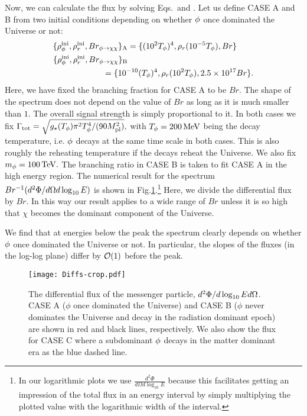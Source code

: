 \documentclass[superscriptaddress,aps,preprintnumbers,amsmath,showpacs,amssymb,prd,nofootinbib,reprint]{revtex4-1}
\begin{document}
Now, we can calculate the flux by solving Eqs.\, and . Let us define CASE A and B from two initial conditions depending on whether $\phi$ once dominated the Universe or not: 
\begin{align}
\nonumber
\{\rho_{\f}^{\rm ini}, \rho_r^{\rm ini}, Br_{\f\to \chi\chi}\}_{\text{A}}&=\{(10^{2}T_\f)^4, \rho_r(10^{-5}T_\f), Br\}\\
\{\rho_{\f}^{\rm ini}, \rho_r^{\rm ini}, Br_{\f\to \chi\chi}\}_{\text{B}}&
\\\nonumber&\!\!\!\!\!\!\!\!\!\!\!\!\!\!\!\!\!\!=\{10^{-10}(T_\f)^4, \rho_r(10^{2}T_\f), 2.5\times 10^{17}Br \}.
\end{align}
Here, we have fixed the branching fraction for CASE A to be $Br$. 
The shape of the spectrum does not depend on the value of $Br$ as long as it is much smaller than $1$. The overall signal strength is simply proportional to it.
In both cases we fix 
$
\Gamma_{\rm tot}= \sqrt{g_{\star}(T_\phi)\pi^2T_\phi^4/(90M_{\rm pl}^2)},
$
with $T_\phi=200{\rm \, MeV}$ being the decay temperature, i.e. $\phi$ decays at the same time scale in both cases. This is also roughly the reheating temperature if the decays reheat the Universe. 
We also fix $m_\phi =100{\rm \, TeV}.$ The branching ratio in CASE B is taken to fit CASE A in the high energy region. 
The numerical result for the spectrum $Br^{-1}(d^2 \Phi/ d\Omega d\log_{10}E )$ is shown in Fig.\ref{fig:1}.\footnote{In our logarithmic plots we use $\frac{d^2\Phi}{ d\Omega d\log_{10}{E}}$ because this facilitates getting an impression of the total flux in an energy interval by simply multiplying the plotted value with the logarithmic width of the interval.}
Here, we divide the differential flux by $Br$. In this way our result applies to a wide range of $Br$ unless it is so high that $\chi$ becomes the dominant component of the Universe.

We find that at energies below the peak the spectrum clearly depends on whether $\phi$ once dominated the Universe or not. 
In particular, the slopes of the fluxes (in {the} log-log plane) differ by $\mathcal{O}(1)$ before the peak. 
\begin{figure}[t!]
\begin{center}  
\texttt{[image: Diffs-crop.pdf]}
\end{center}
\caption{The differential flux of the messenger particle, $d^2 \Phi/d\log_{10}{E} d\Omega$. CASE A ($\phi$ once dominated the Universe)  and CASE B ($\phi$ never dominates the Universe and decay in the radiation dominant epoch) are shown in red and black lines, respectively.
We also show the flux for CASE C where a subdominant $\phi$ decays in the matter dominant era as the blue dashed line. }
\label{fig:1}
\end{figure}
\end{document}
